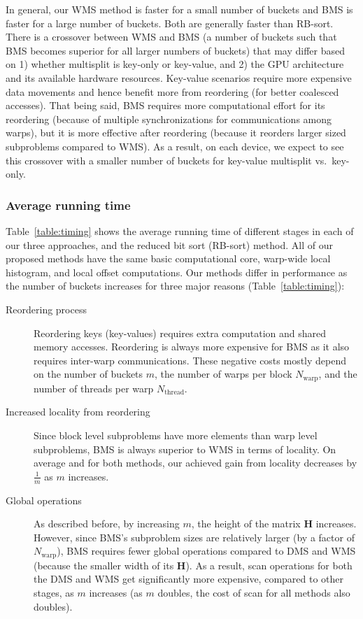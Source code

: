 In general, our WMS method is faster for a small number of buckets and BMS is faster for a large number of buckets. Both are generally faster than RB-sort.
There is a crossover between WMS and BMS (a number of buckets such that BMS becomes superior for all larger numbers of buckets) that may differ based on 1) whether multisplit is key-only or key-value, and 2) the GPU architecture and its available hardware resources.
Key-value scenarios require more expensive data movements and hence benefit more from reordering (for better coalesced accesses).
That being said, BMS requires more computational effort for its reordering (because of multiple synchronizations for communications among warps), but it is more effective after reordering (because it reorders larger sized subproblems compared to WMS).
As a result, on each device, we expect to see this crossover with a smaller number of buckets for key-value multisplit vs.\ key-only.
%

\subsubsection{Average running time}
Table~\ref{table:timing} shows the average running time of different stages in each of our three approaches, and the reduced bit sort (RB-sort) method.
All of our proposed methods have the same basic computational core, warp-wide local histogram, and local offset computations. Our methods differ in performance as the number of buckets increases for three major reasons (Table~\ref{table:timing}):
\begin{description}
        \item [Reordering process] Reordering keys (key-values) requires extra computation and shared memory accesses. Reordering is always more expensive for BMS as it also requires inter-warp communications.
        These negative costs mostly depend on the number of buckets $m$, the number of warps per block $N_\text{warp}$, and the number of threads per warp $N_\text{thread}$.
        \item [Increased locality from reordering] Since block level subproblems have more elements than warp level subproblems, BMS is always superior to WMS in terms of locality.
        On average and for both methods, our achieved gain from locality decreases by $\frac{1}{m}$ as $m$ increases.
        \item [Global operations] As described before, by increasing $m$, the height of the matrix $\mathbf{H}$ increases. However, since BMS's subproblem sizes are relatively larger (by a factor of $N_\text{warp}$), BMS requires fewer global operations compared to DMS and WMS (because the smaller width of its $\mathbf{H}$).
        As a result, scan operations for both the DMS and WMS get significantly more expensive, compared to other stages, as $m$ increases (as $m$ doubles, the cost of scan for all methods also doubles).
\end{description}


